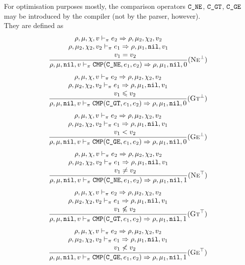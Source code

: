 For optimisation purposes mostly, the comparison operators \(\texttt{C\_NE}\), \(\texttt{C\_GT}\), \(\texttt{C\_GE}\) may be introduced by the compiler (not by the parser, however).\\
They are defined as
\[\dfrac{\begin{array}{c}
    \rho,\mu,\chi,v \vdash_\pi e_2\Rightarrow \rho,\mu_2,\chi_2,v_2 \\
    \rho,\mu_2,\chi_2,v_2 \vdash_\pi e_1\Rightarrow \rho,\mu_1,\texttt{nil},v_1 \\
    \qquad v_1 = v_2
\end{array}}{\rho,\mu,\texttt{nil},v \vdash_\pi \texttt{CMP}(\texttt{C\_NE}, e_1, e_2) \Rightarrow \rho,\mu_1,\texttt{nil},0}(\textsc{Ne}^\bot)\]
\[\dfrac{\begin{array}{c}
    \rho,\mu,\chi,v \vdash_\pi e_2\Rightarrow \rho,\mu_2,\chi_2,v_2 \\
    \rho,\mu_2,\chi_2,v_2 \vdash_\pi e_1\Rightarrow \rho,\mu_1,\texttt{nil},v_1 \\
    \qquad v_1 \leqslant v_2
\end{array}}{\rho,\mu,\texttt{nil},v \vdash_\pi \texttt{CMP}(\texttt{C\_GT}, e_1, e_2) \Rightarrow \rho,\mu_1,\texttt{nil},0}(\textsc{Gt}^\bot)\]
\[\dfrac{\begin{array}{c}
    \rho,\mu,\chi,v \vdash_\pi e_2\Rightarrow \rho,\mu_2,\chi_2,v_2 \\
    \rho,\mu_2,\chi_2,v_2 \vdash_\pi e_1\Rightarrow \rho,\mu_1,\texttt{nil},v_1 \\
    \qquad v_1 < v_2
\end{array}}{\rho,\mu,\texttt{nil},v \vdash_\pi \texttt{CMP}(\texttt{C\_GE}, e_1, e_2) \Rightarrow \rho,\mu_1,\texttt{nil},0}(\textsc{Ge}^\bot)\]
\[\dfrac{\begin{array}{c}
    \rho,\mu,\chi,v \vdash_\pi e_2\Rightarrow \rho,\mu_2,\chi_2,v_2 \\
    \rho,\mu_2,\chi_2,v_2 \vdash_\pi e_1\Rightarrow \rho,\mu_1,\texttt{nil},v_1 \\
    \qquad v_1 \ne v_2
\end{array}}{\rho,\mu,\texttt{nil},v \vdash_\pi \texttt{CMP}(\texttt{C\_NE}, e_1, e_2) \Rightarrow \rho,\mu_1,\texttt{nil},1}(\textsc{Ne}^\top)\]
\[\dfrac{\begin{array}{c}
    \rho,\mu,\chi,v \vdash_\pi e_2\Rightarrow \rho,\mu_2,\chi_2,v_2 \\
    \rho,\mu_2,\chi_2,v_2 \vdash_\pi e_1\Rightarrow \rho,\mu_1,\texttt{nil},v_1 \\
    \qquad v_1 \not\leqslant v_2
\end{array}}{\rho,\mu,\texttt{nil},v \vdash_\pi \texttt{CMP}(\texttt{C\_GT}, e_1, e_2) \Rightarrow \rho,\mu_1,\texttt{nil},1}(\textsc{Gt}^\top)\]
\[\dfrac{\begin{array}{c}
    \rho,\mu,\chi,v \vdash_\pi e_2\Rightarrow \rho,\mu_2,\chi_2,v_2 \\
    \rho,\mu_2,\chi_2,v_2 \vdash_\pi e_1\Rightarrow \rho,\mu_1,\texttt{nil},v_1 \\
    \qquad v_1 \not< v_2
\end{array}}{\rho,\mu,\texttt{nil},v \vdash_\pi \texttt{CMP}(\texttt{C\_GE}, e_1, e_2) \Rightarrow \rho,\mu_1,\texttt{nil},1}(\textsc{Ge}^\top)\]

